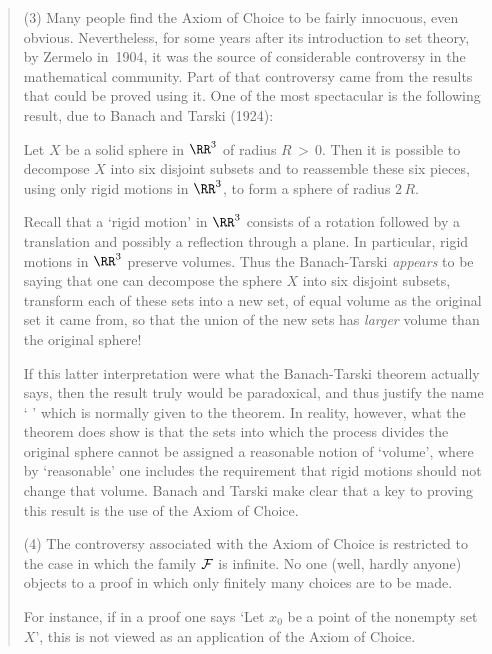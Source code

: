 {\begin{quotation}
{\V

        (3) Many people find the Axiom of Choice to be fairly innocuous, even obvious.
    Nevertheless, for some years after its introduction to set theory, by Zermelo in~1904,
    it was the source of considerable controversy in the mathematical community.
    Part of that controversy came from the results that could be proved using it.
    One of the most spectacular is the following result, due to Banach and Tarski (1924):

        Let $X$ be a solid sphere in ${\RR}^{3}$ of radius $R\,>\,0$.
    Then it is possible to decompose $X$ into six disjoint subsets and to reassemble these six pieces, using only rigid motions in ${\RR}^{3}$, to form a sphere of radius $2\,R$.

        Recall that a `rigid motion' in ${\RR}^{3}$ consists of a rotation followed by a translation and possibly a reflection through a plane.
    In particular, rigid motions in ${\RR}^{3}$ preserve volumes. Thus the Banach-Tarski {\em appears} to be saying that one can decompose the sphere $X$ into six disjoint subsets,
    transform each of these sets into a new set, of equal volume as the original set it came from,
    so that the union of the new sets has {\em larger} volume than the original sphere!

        If this latter interpretation were what the Banach-Tarski theorem actually says,
    then the result truly would be paradoxical, and thus justify the name `
' which is normally given to the theorem.
    In reality, however, what the theorem does show is that the sets into which the process divides the original sphere cannot be assigned a reasonable notion of `volume',
    where by `reasonable' one includes the requirement that rigid motions should not change that volume.
    Banach and Tarski make clear that a key to proving this result is the use of the Axiom of Choice.

\V

        (4) The controversy associated with the Axiom of Choice is restricted to the case in which the family ${\cal F}$ is infinite.
    No one (well, hardly anyone) objects to a proof in which only finitely many choices are to be made.

        For instance, if in a proof one says `Let $x_{0}$ be a point of the nonempty set $X$', this is not viewed as an application of the Axiom of Choice.
}%
\end{quotation}

}
